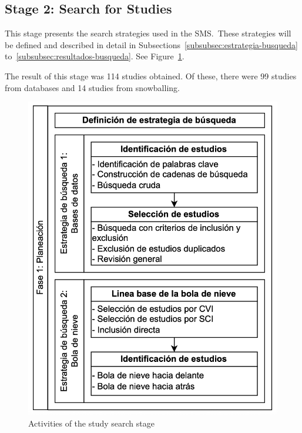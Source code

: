 \newcommand{\totalStudies}{114}
\newcommand{\databaseStudies}{99}
\newcommand{\snowballStudies}{14}
\newcommand{\directInclusionStudies}{0}



\subsection{Stage 2: Search for Studies}

This stage presents the search strategies used in the SMS.~These strategies will be defined and described in detail in Subsections~\ref{subsubsec:estrategia-busqueda} to~\ref{subsubsec:resultados-busqueda}. See Figure~\ref{fig:busqueda-estudios}.

The result of this stage was \totalStudies{} studies obtained. Of these, there were \databaseStudies{} studies from databases and \snowballStudies{} studies from snowballing.


\begin{figure}[htbp]
	\centering
	\vspace{10pt}
	\includegraphics[scale=0.33]{resources/figures/fig03-fase1-planeacion.png}
	\caption{Activities of the study search stage}
	\label{fig:busqueda-estudios}
\end{figure}

